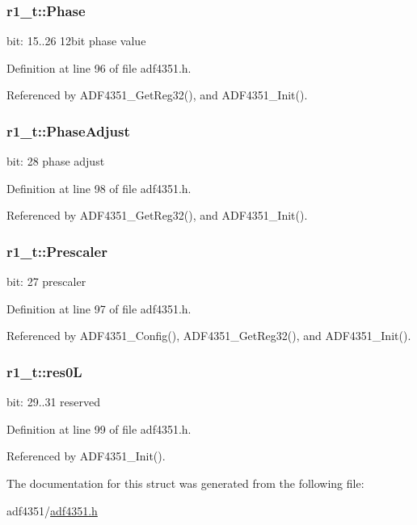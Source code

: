 \subsubsection[{\texorpdfstring{Phase}{Phase}}]{ r1\+\_\+t\+::\+Phase}\hypertarget{structr1__t_a08f87626a225a1256a9c45bb0d42af8a}{}\label{structr1__t_a08f87626a225a1256a9c45bb0d42af8a}
bit\+: 15..26 12bit phase value 

Definition at line 96 of file adf4351.\+h.



Referenced by A\+D\+F4351\+\_\+\+Get\+Reg32(), and A\+D\+F4351\+\_\+\+Init().

\subsubsection[{\texorpdfstring{Phase\+Adjust}{PhaseAdjust}}]{ r1\+\_\+t\+::\+Phase\+Adjust}\hypertarget{structr1__t_a339b676bde09218794b49904eb456a38}{}\label{structr1__t_a339b676bde09218794b49904eb456a38}
bit\+: 28 phase adjust 

Definition at line 98 of file adf4351.\+h.



Referenced by A\+D\+F4351\+\_\+\+Get\+Reg32(), and A\+D\+F4351\+\_\+\+Init().

\subsubsection[{\texorpdfstring{Prescaler}{Prescaler}}]{ r1\+\_\+t\+::\+Prescaler}\hypertarget{structr1__t_a9ee672a7fdd3a2d60591d43557feb390}{}\label{structr1__t_a9ee672a7fdd3a2d60591d43557feb390}
bit\+: 27 prescaler 

Definition at line 97 of file adf4351.\+h.



Referenced by A\+D\+F4351\+\_\+\+Config(), A\+D\+F4351\+\_\+\+Get\+Reg32(), and A\+D\+F4351\+\_\+\+Init().

\subsubsection[{\texorpdfstring{res0L}{res0L}}]{ r1\+\_\+t\+::res0L}\hypertarget{structr1__t_a0ce8c11e3227892e5d9afcde148d9300}{}\label{structr1__t_a0ce8c11e3227892e5d9afcde148d9300}
bit\+: 29..31 reserved 

Definition at line 99 of file adf4351.\+h.



Referenced by A\+D\+F4351\+\_\+\+Init().



The documentation for this struct was generated from the following file\+:\begin{DoxyCompactItemize}
\item 
adf4351/\hyperlink{adf4351_8h}{adf4351.\+h}\end{DoxyCompactItemize}
